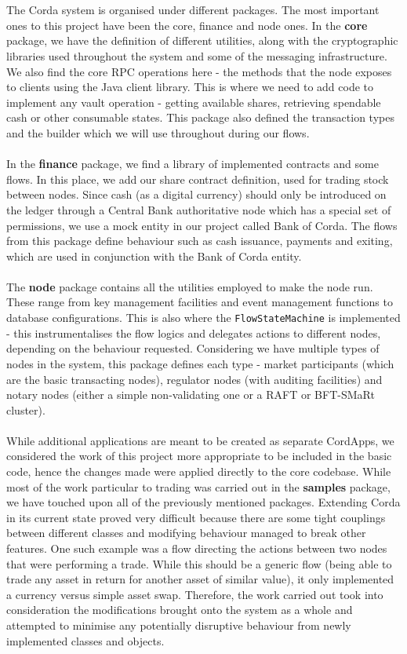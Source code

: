\documentclass[12pt,twoside]{article}
\begin{document}
\\ \\
The Corda system is organised under different packages. The most important ones to this project have been the core, finance and node ones. In the \textbf{core} package, we have the definition of different utilities, along with the cryptographic libraries used throughout the system and some of the messaging infrastructure. We also find the core RPC operations here - the methods that the node exposes to clients using the Java client library. This is where we need to add code to implement any vault operation - getting available shares, retrieving spendable cash or other consumable states. This package also defined the transaction types and the builder which we will use throughout during our flows.
\\ \\
In the \textbf{finance} package, we find a library of implemented contracts and some flows. In this place, we add our share contract definition, used for trading stock between nodes. Since cash (as a digital currency) should only be introduced on the ledger through a Central Bank authoritative node which has a special set of permissions, we use a mock entity in our project called Bank of Corda. The flows from this package define behaviour such as cash issuance, payments and exiting, which are used in conjunction with the Bank of Corda entity. 
\\ \\
The \textbf{node} package contains all the utilities employed to make the node run. These range from key management facilities and event management functions to database configurations. This is also where the \verb|FlowStateMachine| is implemented - this instrumentalises the flow logics and delegates actions to different nodes, depending on the behaviour requested. Considering we have multiple types of nodes in the system, this package defines each type - market participants (which are the basic transacting nodes), regulator nodes (with auditing facilities) and notary nodes (either a simple non-validating one or a RAFT or BFT-SMaRt cluster).
\\ \\
While additional applications are meant to be created as separate CordApps, we considered the work of this project more appropriate to be included in the basic code, hence the changes made were applied directly to the core codebase. While most of the work particular to trading was carried out in the \textbf{samples} package, we have touched upon all of the previously mentioned packages. Extending Corda in its current state proved very difficult because there are some tight couplings between different classes and modifying behaviour managed to break other features. One such example was a flow directing the actions between two nodes that were performing a trade. While this should be a generic flow (being able to trade any asset in return for another asset of similar value), it only implemented a currency versus simple asset swap. Therefore, the work carried out took into consideration the modifications brought onto the system as a whole and attempted to minimise any potentially disruptive behaviour from newly implemented classes and objects.
\newpage
\end{document}
